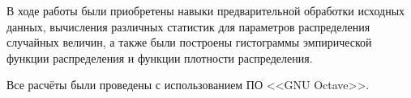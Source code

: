 \Conclusion

В ходе работы были приобретены навыки предварительной обработки исходных данных, вычисления различных статистик для параметров распределения случайных величин, а также были построены гистограммы эмпирической функции распределения и функции плотности распределения.

Все расчёты были проведены с использованием ПО <<GNU Octave>>.
